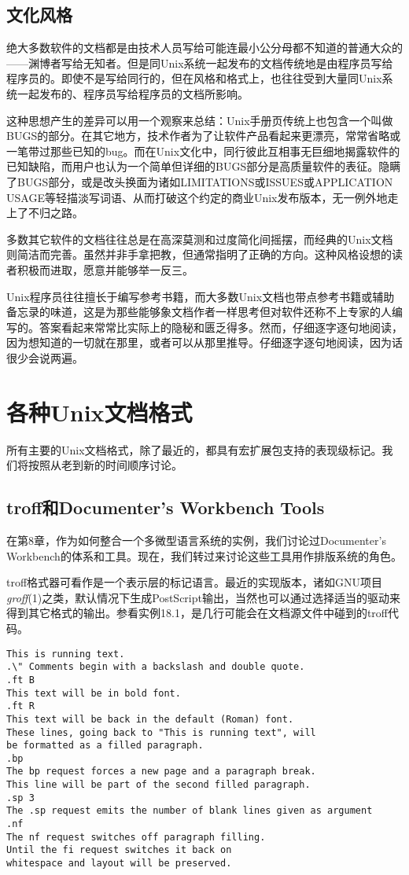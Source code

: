 \documentclass[12pt,oneside]{ctexbook}
\begin{document}
\begin{common-format}
\subsection{文化风格}
绝大多数软件的文档都是由技术人员写给可能连最小公分母都不知道的普通大众的——渊博者写给无知者。但是同Unix系统一起发布的文档传统地是由程序员写给程序员的。即使不是写给同行的，但在风格和格式上，也往往受到大量同Unix系统一起发布的、程序员写给程序员的文档所影响。

这种思想产生的差异可以用一个观察来总结：Unix手册页传统上也包含一个叫做BUGS的部分。在其它地方，技术作者为了让软件产品看起来更漂亮，常常省略或一笔带过那些已知的bug。而在Unix文化中，同行彼此互相事无巨细地揭露软件的已知缺陷，而用户也认为一个简单但详细的BUGS部分是高质量软件的表征。隐瞒了BUGS部分，或是改头换面为诸如LIMITATIONS或ISSUES或APPLICATION USAGE等轻描淡写词语、从而打破这个约定的商业Unix发布版本，无一例外地走上了不归之路。

多数其它软件的文档往往总是在高深莫测和过度简化间摇摆，而经典的Unix文档则简洁而完善。虽然并非手拿把教，但通常指明了正确的方向。这种风格设想的读者积极而进取，愿意并能够举一反三。

Unix程序员往往擅长于编写参考书籍，而大多数Unix文档也带点参考书籍或辅助备忘录的味道，这是为那些能够象文档作者一样思考但对软件还称不上专家的人编写的。答案看起来常常比实际上的隐秘和匮乏得多。然而，仔细逐字逐句地阅读，因为想知道的一切就在那里，或者可以从那里推导。仔细逐字逐句地阅读，因为话很少会说两遍。

\section{各种Unix文档格式}
所有主要的Unix文档格式，除了最近的，都具有宏扩展包支持的表现级标记。我们将按照从老到新的时间顺序讨论。

\subsection{troff和Documenter's Workbench Tools}
在第8章，作为如何整合一个多微型语言系统的实例，我们讨论过Documenter's Workbench的体系和工具。现在，我们转过来讨论这些工具用作排版系统的角色。

troff格式器可看作是一个表示层的标记语言。最近的实现版本，诸如GNU项目\textit{groff}(1)之类，默认情况下生成PostScript输出，当然也可以通过选择适当的驱动来得到其它格式的输出。参看实例18.1，是几行可能会在文档源文件中碰到的troff代码。
\begin{Verbatim}[label=例18.1  groff(1)标记实例]
This is running text.
.\" Comments begin with a backslash and double quote.
.ft B
This text will be in bold font.
.ft R
This text will be back in the default (Roman) font.
These lines, going back to "This is running text", will
be formatted as a filled paragraph.
.bp
The bp request forces a new page and a paragraph break.
This line will be part of the second filled paragraph.
.sp 3
The .sp request emits the number of blank lines given as argument
.nf
The nf request switches off paragraph filling.
Until the fi request switches it back on
whitespace and layout will be preserved.


\end{Verbatim}
\end{common-format}
\end{document}
